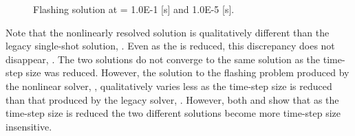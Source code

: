 \begin{figure}[h!t]
\centering
{}
\caption[Flashing solution at \dtmax{} = 1.0E-1 {[s]}and 1.0E-5 {[s]}]{Flashing solution at \dtmax{} = 1.0E-1 {[s]} and 1.0E-5 {[s]}.}
\label{fig:flashing_compare_1}
\end{figure}

Note that the nonlinearly resolved solution is qualitatively different than the legacy single-shot solution, .
Even as the \dtmax{} is reduced, this discrepancy does not disappear, .
The two solutions do not converge to the same solution as the time-step size was reduced.
However, the solution to the flashing problem produced by the nonlinear solver, , qualitatively varies less as the time-step size is reduced than that produced by the legacy solver, .
However, both  and  show that as the time-step size is reduced the two different solutions become more time-step size insensitive.

